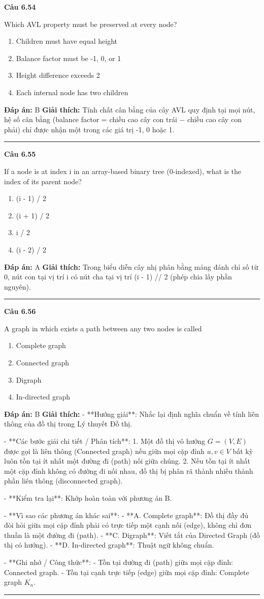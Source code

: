 \documentclass[11pt,a4paper]{article}
\newenvironment{question}[1]{%
  \par\vspace{1em}\noindent\textbf{\large Câu #1}\par\vspace{0.4em}
}{%
  \par\vspace{1em}\hrule\vspace{0.6em}
}
\newenvironment{choices}{%
  \begin{enumerate}[label=\textbf{\Alph*.},leftmargin=2.2em,itemsep=2pt,topsep=3pt]
}{%
  \end{enumerate}
}
\newcommand{\choice}{\item}
\begin{document}
\begin{question}{6.54}
Which AVL property must be preserved at every node?
\begin{choices}
\choice Children must have equal height
\choice Balance factor must be -1, 0, or 1
\choice Height difference exceeds 2
\choice Each internal node has two children
\end{choices}
\textbf{Đáp án:} B
\textbf{Giải thích:} Tính chất cân bằng của cây AVL quy định tại mọi nút, hệ số cân bằng (balance factor = chiều cao cây con trái − chiều cao cây con phải) chỉ được nhận một trong các giá trị -1, 0 hoặc 1.
\end{question}

\begin{question}{6.55}
If a node is at index i in an array-based binary tree (0-indexed), what is the index of its parent node?
\begin{choices}
\choice (i - 1) / 2
\choice (i + 1) / 2
\choice i / 2
\choice (i - 2) / 2
\end{choices}
\textbf{Đáp án:} A
\textbf{Giải thích:} Trong biểu diễn cây nhị phân bằng mảng đánh chỉ số từ 0, nút con tại vị trí i có nút cha tại vị trí (i - 1) // 2 (phép chia lấy phần nguyên).
\end{question}

\begin{question}{6.56}
A graph in which exists a path between any two nodes is called
\begin{choices}
\choice Complete graph
\choice Connected graph
\choice Digraph
\choice In-directed graph
\end{choices}
\textbf{Đáp án:} B
\textbf{Giải thích:} - **Hướng giải**:
  Nhắc lại định nghĩa chuẩn về tính liên thông của đồ thị trong Lý thuyết Đồ thị.

- **Các bước giải chi tiết / Phân tích**:
  1. Một đồ thị vô hướng \(G = (V, E)\) được gọi là liên thông (Connected graph) nếu giữa mọi cặp đỉnh \(u, v \in V\) bất kỳ luôn tồn tại ít nhất một đường đi (path) nối giữa chúng.
  2. Nếu tồn tại ít nhất một cặp đỉnh không có đường đi nối nhau, đồ thị bị phân rã thành nhiều thành phần liên thông (disconnected graph).

- **Kiểm tra lại**:
  Khớp hoàn toàn với phương án B.

- **Vì sao các phương án khác sai**:
  - **A. Complete graph**: Đồ thị đầy đủ đòi hỏi giữa mọi cặp đỉnh phải có trực tiếp một cạnh nối (edge), không chỉ đơn thuần là một đường đi (path).
  - **C. Digraph**: Viết tắt của Directed Graph (đồ thị có hướng).
  - **D. In-directed graph**: Thuật ngữ không chuẩn.

- **Ghi nhớ / Công thức**:
  - Tồn tại đường đi (path) giữa mọi cặp đỉnh: Connected graph.
  - Tồn tại cạnh trực tiếp (edge) giữa mọi cặp đỉnh: Complete graph \(K_n\).
\end{question}
\end{document}
